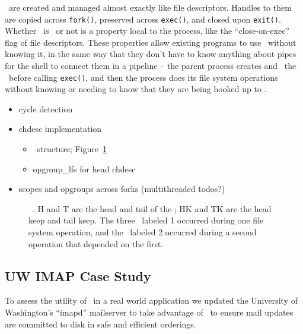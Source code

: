 \Opgroups\ are created and managed almost exactly like file descriptors. Handles
to them are copied across \texttt{fork()}, preserved across \texttt{exec()}, and
closed upon \texttt{exit()}. Whether \anopgroup\ is \engaged\ or not is a
property local to the process, like the ``close-on-exec'' flag of file
descriptors. These properties allow existing programs to use \opgroups\ without
knowing it, in the same way that they don't have to know anything about pipes
for the shell to connect them in a pipeline -- the parent process creates and
\engages\ the \opgroups\ before calling \texttt{exec()}, and then the process
does its file system operations without knowing or needing to know that they are
being hooked up to \anopgroup.

\begin{itemize}
\item cycle detection
\item chdesc implementation
  \begin{itemize}
  \item \chdesc\ structure; Figure~\ref{fig:opgroup-chdescs}
  \item opgroup\_lfs for head chdesc
  \end{itemize}
\item scopes and opgroups across forks (multithreaded todos?)
\end{itemize}

\begin{figure}[htb]
\caption{\label{fig:opgroup-chdescs} \Opgroup\ \ChDescs. H and T are the head
and tail of the \opgroup; HK and TK are the head keep and tail keep. The three
\chdescs\ labeled 1 occurred during one file system operation, and the \chdesc\
labeled 2 occurred during a second operation that depended on the first.}
\end{figure}

\subsection{UW IMAP Case Study}
\label{sec:opgroup:uwimap}


To assess the utility of \opgroups\ in a real world application we
updated the University of Washington's ``imapd'' mailserver to take
advantage of \opgroups\ to ensure mail updates are committed to disk
in safe and efficient orderings.

